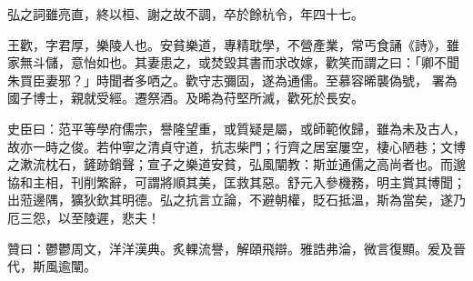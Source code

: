 \begin{pinyinscope}
 弘之詞雖亮直，終以桓、謝之故不調，卒於餘杭令，年四十七。



 王歡，字君厚，樂陵人也。安貧樂道，專精耽學，不營產業，常丐食誦《詩》，雖家無斗儲，意怡如也。其妻患之，或焚毀其書而求改嫁，歡笑而謂之曰：「卿不聞朱買臣妻邪？」時聞者多哂之。歡守志彌固，遂為通儒。至慕容晞襲偽號，
 署為國子博士，親就受經。遷祭酒。及晞為苻堅所滅，歡死於長安。



 史臣曰：范平等學府儒宗，譽隆望重，或質疑是屬，或師範攸歸，雖為未及古人，故亦一時之俊。若仲寧之清貞守道，抗志柴門；行齊之居室屢空，棲心陋巷；文博之漱流枕石，鏟跡銷聲；宣子之樂道安貧，弘風闡教：斯並通儒之高尚者也。而邈協和主相，刊削繁辭，可謂將順其美，匡救其惡。舒元入參機務，明主賞其博聞；出蒞邊隅，獷狄欽其明德。弘之抗言立論，不避朝權，貶石抵溫，斯為當矣，遂乃厄三怨，以至陵遲，悲夫！



 贊曰：鬱鬱周文，洋洋漢典。炙輠流譽，解頤飛辯。雅誥弗淪，微言復顯。爰及晉代，斯風逾闡。



\end{pinyinscope}